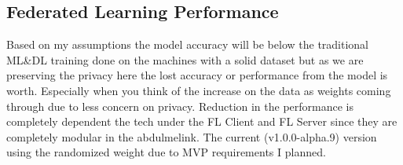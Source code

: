 \subsection{Federated Learning Performance}

Based on my assumptions the model accuracy will be below the traditional ML&DL training done on the machines with a solid dataset but as we are preserving the privacy here the lost accuracy or performance from the model is worth. Especially when you think of the increase on the data as weights coming through due to less concern on privacy. Reduction in the performance is completely dependent the tech under the FL Client and FL Server since they are completely modular in the abdulmelink. The current (v1.0.0-alpha.9) version using the randomized weight due to MVP requirements I planned.

